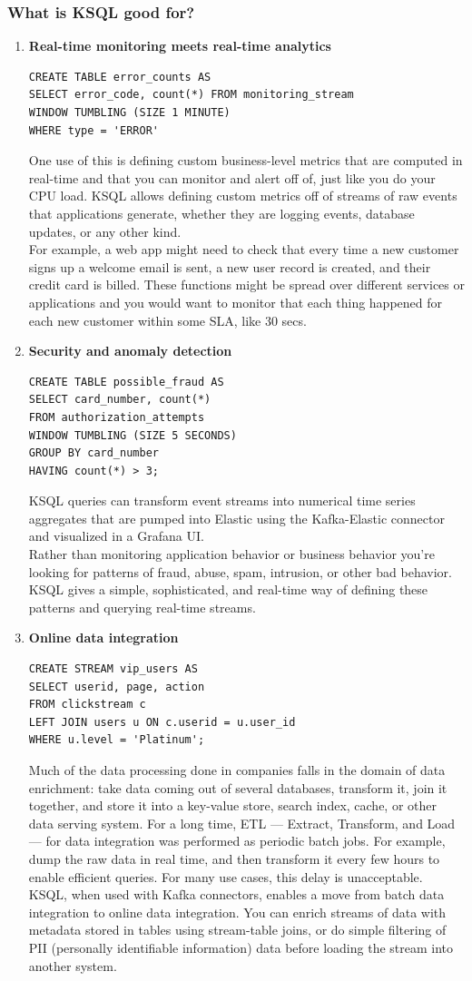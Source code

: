 \documentclass[10pt,a4paper]{article}
\begin{document}
 \subsubsection{What is KSQL good for?}
 \begin{enumerate}
 	\item \textbf{Real-time monitoring meets real-time analytics}
 	\begin{verbatim}
CREATE TABLE error_counts AS
SELECT error_code, count(*) FROM monitoring_stream
WINDOW TUMBLING (SIZE 1 MINUTE)
WHERE type = 'ERROR'
\end{verbatim}
One use of this is defining custom business-level metrics that are computed in real-time and that you can monitor and alert off of, just like you do your CPU load. KSQL allows defining custom metrics off of streams of raw events that applications generate, whether they are logging events, database updates, or any other kind. \\
For example, a web app might need to check that every time a new customer signs up a welcome email is sent, a new user record is created, and their credit card is billed. These functions might be spread over different services or applications and you would want to monitor that each thing happened for each new customer within some SLA, like 30 secs.
\item  \textbf{Security and anomaly detection}
\begin{verbatim}
CREATE TABLE possible_fraud AS
SELECT card_number, count(*)
FROM authorization_attempts
WINDOW TUMBLING (SIZE 5 SECONDS)
GROUP BY card_number
HAVING count(*) > 3;
\end{verbatim}
KSQL queries can transform event streams into numerical time series aggregates that are pumped into Elastic using the Kafka-Elastic connector and visualized in a Grafana UI. \\
Rather than monitoring application behavior or business behavior you’re looking for patterns of fraud, abuse, spam, intrusion, or other bad behavior. KSQL gives a simple, sophisticated, and real-time way of defining these patterns and querying real-time streams.
\item \textbf{Online data integration}
\begin{verbatim}
CREATE STREAM vip_users AS
SELECT userid, page, action 
FROM clickstream c 
LEFT JOIN users u ON c.userid = u.user_id
WHERE u.level = 'Platinum';
\end{verbatim}
Much of the data processing done in companies falls in the domain of data enrichment: take data coming out of several databases, transform it, join it together, and store it into a key-value store, search index, cache, or other data serving system. For a long time, ETL — Extract, Transform, and Load — for data integration was performed as periodic batch jobs. For example, dump the raw data in real time, and then transform it every few hours to enable efficient queries. For many use cases, this delay is unacceptable. KSQL, when used with Kafka connectors, enables a move from batch data integration to online data integration. You can enrich streams of data with metadata stored in tables using stream-table joins, or do simple filtering of PII (personally identifiable information) data before loading the stream into another system.

\end{enumerate}
\end{document}
